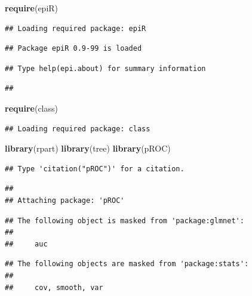 \documentclass[]{article}
\newenvironment{Shaded}{\begin{snugshade}}{\end{snugshade}}
\newcommand{\KeywordTok}[1]{\textcolor[rgb]{0.13,0.29,0.53}{\textbf{#1}}}
\newcommand{\NormalTok}[1]{#1}
\begin{document}
\begin{Shaded}
\begin{Highlighting}[]
\KeywordTok{require}\NormalTok{(epiR)}
\end{Highlighting}
\end{Shaded}

\begin{verbatim}
## Loading required package: epiR
\end{verbatim}

\begin{verbatim}
## Package epiR 0.9-99 is loaded
\end{verbatim}

\begin{verbatim}
## Type help(epi.about) for summary information
\end{verbatim}

\begin{verbatim}
## 
\end{verbatim}

\begin{Shaded}
\begin{Highlighting}[]
\KeywordTok{require}\NormalTok{(class)}
\end{Highlighting}
\end{Shaded}

\begin{verbatim}
## Loading required package: class
\end{verbatim}

\begin{Shaded}
\begin{Highlighting}[]
\KeywordTok{library}\NormalTok{(rpart)}
\KeywordTok{library}\NormalTok{(tree)}
\KeywordTok{library}\NormalTok{(pROC)}
\end{Highlighting}
\end{Shaded}

\begin{verbatim}
## Type 'citation("pROC")' for a citation.
\end{verbatim}

\begin{verbatim}
## 
## Attaching package: 'pROC'
\end{verbatim}

\begin{verbatim}
## The following object is masked from 'package:glmnet':
## 
##     auc
\end{verbatim}

\begin{verbatim}
## The following objects are masked from 'package:stats':
## 
##     cov, smooth, var
\end{verbatim}
\end{document}
